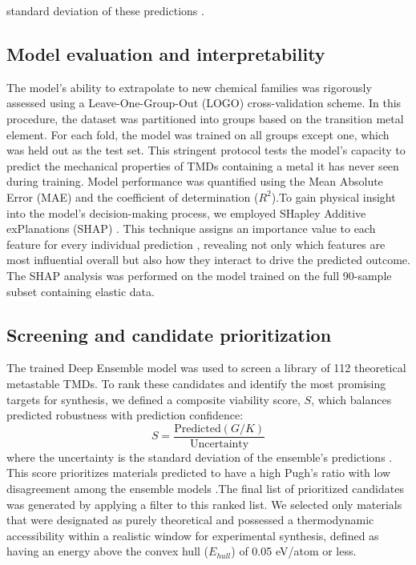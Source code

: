 \documentclass[]{article}
\begin{document}
standard deviation of these predictions \citep{egele2022autodeuqautomateddeepensemble}.\subsection{Model evaluation and interpretability}The model's ability to extrapolate to new chemical families was rigorously assessed using a Leave-One-Group-Out (LOGO) cross-validation scheme. In this procedure, the dataset was partitioned into groups based on the transition metal element. For each fold, the model was trained on all groups except one, which was held out as the test set. This stringent protocol tests the model's capacity to predict the mechanical properties of TMDs containing a metal it has never seen during training. Model performance was quantified using the Mean Absolute Error (MAE) and the coefficient of determination ($R^2$).To gain physical insight into the model's decision-making process, we employed SHapley Additive exPlanations (SHAP) \citep{lundberg2017unifiedapproachinterpretingmodel}. This technique assigns an importance value to each feature for every individual prediction \citep{lundberg2017unifiedapproachinterpretingmodel}, revealing not only which features are most influential overall but also how they interact to drive the predicted outcome. The SHAP analysis was performed on the model trained on the full 90-sample subset containing elastic data.\subsection{Screening and candidate prioritization}The trained Deep Ensemble model was used to screen a library of 112 theoretical metastable TMDs. To rank these candidates and identify the most promising targets for synthesis, we defined a composite viability score, $S$, which balances predicted robustness with prediction confidence:\begin{equation}S = \frac{\text{Predicted}(G/K)}{\text{Uncertainty}}\end{equation}where the uncertainty is the standard deviation of the ensemble's predictions \citep{mcafee2026iconfusedconfusingdeep}. This score prioritizes materials predicted to have a high Pugh's ratio with low disagreement among the ensemble models \citep{mcafee2026iconfusedconfusingdeep}.The final list of prioritized candidates was generated by applying a filter to this ranked list. We selected only materials that were designated as purely theoretical and possessed a thermodynamic accessibility within a realistic window for experimental synthesis, defined as having an energy above the convex hull ($E_{hull}$) of 0.05 eV/atom or less.
\end{document}
